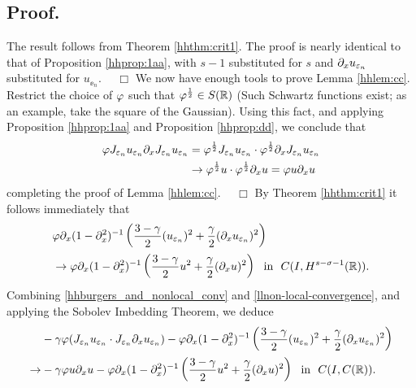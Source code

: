 			\subsection{ Proof.} The result follows from Theorem \ref{hhthm:crit1}.
			The proof is nearly identical to that of
			Proposition \ref{hhprop:1aa}, with $s-1$ substituted for $s$
			and $\partial_x u_{\varepsilon_n}$ substituted for $u_{\ee_n}$. $\quad \Box$
			We now have enough tools to prove Lemma \ref{hhlem:cc}. Restrict the
			choice of $\varphi$ such that $\varphi^\frac{1}{2} \in S(\mathbb{R})$
			(Such Schwartz functions exist; as an example, take the square
			of the Gaussian). Using this fact, and applying Proposition
			\ref{hhprop:1aa} and Proposition \ref{hhprop:dd}, we conclude that
			\begin{equation*}
				\begin{split}
					\varphi J_{\varepsilon_n} u_{\varepsilon_n} \partial_x J_{\varepsilon_n} u_{\varepsilon_n} 
					& = \varphi^\frac{1}{2} J_{\varepsilon_n} u_{\varepsilon_n} \cdot
					\varphi^\frac{1}{2} \partial_x J_{\varepsilon_n} u_{\varepsilon_n}
					\\
					& \to \varphi^\frac{1}{2} u \cdot \varphi^\frac{1}{2} \partial_x u = \varphi
					u \partial_x u
				\end{split}
			\end{equation*}
			completing the proof of Lemma \ref{hhlem:cc}. $\quad \Box$
%
%
%
%
By Theorem \ref{hhthm:crit1} it follows immediately that
		\begin{equation}
			\begin{split}
				& \varphi \partial_x(1- \partial_x^2)^{-1} \left( \frac{3-\gamma}{2}
				(u_{\varepsilon_n})^2
				 + \frac{\gamma}{2} (\partial_x u_{\varepsilon_n})^2 \right )
				 \\
				 & \to
				 \varphi \partial_x(1- \partial_x^2)^{-1} \left( \frac{3-\gamma}{2} u^2
				 + \frac{\gamma}{2} (\partial_x u)^2 \right ) \ \
				 \text{in} \ \ C(I, H^{s-\sigma-1}(\mathbb{R})).
				\label{llnon-local-convergence}
			\end{split}
		\end{equation}
		Combining \eqref{hhburgers_and_nonlocal_conv} and
		\eqref{llnon-local-convergence}, and applying the Sobolev Imbedding
		Theorem, we deduce 
		\begin{equation}
			\begin{split}
				& -\gamma \varphi (J_{\varepsilon_n} u_{\varepsilon_n} \cdot J_{\varepsilon_n} \partial_x
				u_{\varepsilon_n}) -
				\varphi \partial_x(1- \partial_x^2)^{-1} \left( \frac{3-\gamma}{2}
				(u_{\varepsilon_n})^2
				 + \frac{\gamma}{2} (\partial_x u_{\varepsilon_n})^2 \right )
				 \\
				 \to & -\gamma \varphi u \partial_x u -
				 \varphi \partial_x(1- \partial_x^2)^{-1} \left( \frac{3-\gamma}{2} u^2
				 + \frac{\gamma}{2} (\partial_x u)^2 \right ) \ \
				 \text{in} \ \ C(I, C(\mathbb{R})).
				\label{llloc-non-loc-tog}
			\end{split}
		\end{equation}
